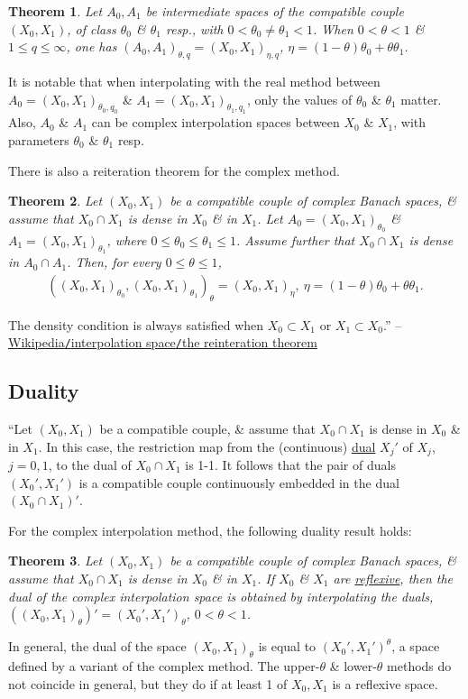 \documentclass[oneside]{book}
\numberwithin{equation}{section}
\newtheorem{theorem}{Theorem}[chapter]
\begin{document}
\begin{theorem}
	Let $A_0,A_1$ be intermediate spaces of the compatible couple $(X_0,X_1)$, of class $\theta_0$ \& $\theta_1$ resp., with $0 < \theta_0\ne\theta_1 < 1$. When $0 < \theta < 1$ \& $1\le q\le\infty$, one has $(A_0,A_1)_{\theta,q} = (X_0,X_1)_{\eta,q}$, $\eta = (1 - \theta)\theta_0 + \theta\theta_1$.
\end{theorem}
It is notable that when interpolating with the real method between $A_0 = (X_0,X_1)_{\theta_0,q_0}$ \& $A_1 = (X_0,X_1)_{\theta_1,q_1}$, only the values of $\theta_0$ \& $\theta_1$ matter. Also, $A_0$ \& $A_1$ can be complex interpolation spaces between $X_0$ \& $X_1$, with parameters $\theta_0$ \& $\theta_1$ resp.

There is also a reiteration theorem for the complex method.

\begin{theorem}
	Let $(X_0,X_1)$ be a compatible couple of complex Banach spaces, \& assume that $X_0\cap X_1$ is dense in $X_0$ \& in $X_1$. Let $A_0 = (X_0,X_1)_{\theta_0}$ \& $A_1 = (X_0,X_1)_{\theta_1}$, where $0\le\theta_0\le\theta_1\le 1$. Assume further that $X_0\cap X_1$ is dense in $A_0\cap A_1$. Then, for every $0\le\theta\le 1$,
	\begin{align*}
		\left((X_0,X_1)_{\theta_0},(X_0,X_1)_{\theta_1}\right)_\theta = (X_0,X_1)_\eta,\ \eta = (1 - \theta)\theta_0 + \theta\theta_1.
	\end{align*}
\end{theorem}
The density condition is always satisfied when $X_0\subset X_1$ or $X_1\subset X_0$.'' -- \href{https://en.wikipedia.org/wiki/Interpolation_space#The_reiteration_theorem}{Wikipedia\texttt{/}interpolation space\texttt{/}the reinteration theorem}

\subsection{Duality}
``Let $(X_0,X_1)$ be a compatible couple, \& assume that $X_0\cap X_1$ is dense in $X_0$ \& in $X_1$. In this case, the restriction map from the (continuous) \href{https://en.wikipedia.org/wiki/Dual_space#Continuous_dual_space}{dual} $X_j'$ of $X_j$, $j = 0,1$, to the dual of $X_0\cap X_1$ is 1-1. It follows that the pair of duals $(X_0',X_1')$ is a compatible couple continuously embedded in the dual $(X_0\cap X_1)'$.

For the complex interpolation method, the following duality result holds:

\begin{theorem}
	Let $(X_0,X_1)$ be a compatible couple of complex Banach spaces, \& assume that $X_0\cap X_1$ is dense in $X_0$ \& in $X_1$. If $X_0$ \& $X_1$ are \href{https://en.wikipedia.org/wiki/Reflexive_space}{reflexive}, then the dual of the complex interpolation space is obtained by interpolating the duals, $((X_0,X_1)_\theta)' = (X_0',X_1')_\theta$, $0 < \theta < 1$.
\end{theorem}
In general, the dual of the space $(X_0,X_1)_\theta$ is equal to $(X_0',X_1')^\theta$, a space defined by a variant of the complex method. The upper-$\theta$ \& lower-$\theta$ methods do not coincide in general, but they do if at least 1 of $X_0,X_1$ is a reflexive space.
\end{document}
